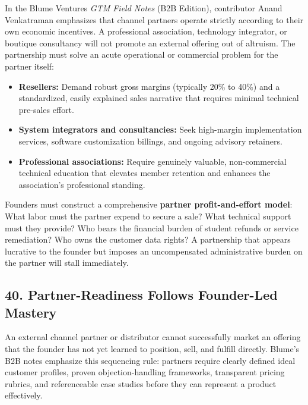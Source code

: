 In the Blume Ventures \textit{GTM Field Notes} (B2B Edition), contributor Anand Venkatraman emphasizes that channel partners operate strictly according to their own economic incentives. A professional association, technology integrator, or boutique consultancy will not promote an external offering out of altruism. The partnership must solve an acute operational or commercial problem for the partner itself:
\begin{itemize}[leftmargin=*,itemsep=1pt]
  \item \textbf{Resellers:} Demand robust gross margins (typically 20\% to 40\%) and a standardized, easily explained sales narrative that requires minimal technical pre-sales effort.
  \item \textbf{System integrators and consultancies:} Seek high-margin implementation services, software customization billings, and ongoing advisory retainers.
  \item \textbf{Professional associations:} Require genuinely valuable, non-commercial technical education that elevates member retention and enhances the association's professional standing.
\end{itemize}

Founders must construct a comprehensive \textbf{partner profit-and-effort model}: What labor must the partner expend to secure a sale? What technical support must they provide? Who bears the financial burden of student refunds or service remediation? Who owns the customer data rights? A partnership that appears lucrative to the founder but imposes an uncompensated administrative burden on the partner will stall immediately.

\subsection*{40. Partner-Readiness Follows Founder-Led Mastery}

An external channel partner or distributor cannot successfully market an offering that the founder has not yet learned to position, sell, and fulfill directly. Blume's B2B notes emphasize this sequencing rule: partners require clearly defined ideal customer profiles, proven objection-handling frameworks, transparent pricing rubrics, and referenceable case studies before they can represent a product effectively.

